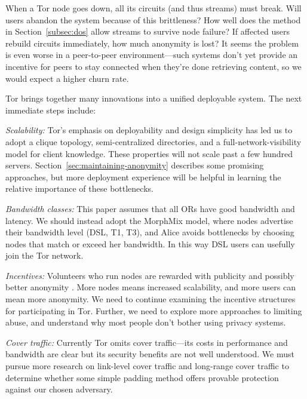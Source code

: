 \documentclass[times,10pt,twocolumn]{article}
\begin{document}

When a Tor node goes down, all its circuits (and thus streams) must break.
Will users abandon the system because of this brittleness? How well
does the method in Section~\ref{subsec:dos} allow streams to survive
node failure? If affected users rebuild circuits immediately, how much
anonymity is lost? It seems the problem is even worse in a peer-to-peer
environment---such systems don't yet provide an incentive for peers to
stay connected when they're done retrieving content, so we would expect
a higher churn rate.


\label{sec:conclusion}

Tor brings together many innovations into a unified deployable system. The
next immediate steps include:

\emph{Scalability:} Tor's emphasis on deployability and design simplicity
has led us to adopt a clique topology, semi-centralized
directories, and a full-network-visibility model for client
knowledge. These properties will not scale past a few hundred servers.
Section~\ref{sec:maintaining-anonymity} describes some promising
approaches, but more deployment experience will be helpful in learning
the relative importance of these bottlenecks.

\emph{Bandwidth classes:} This paper assumes that all ORs have
good bandwidth and latency. We should instead adopt the MorphMix model,
where nodes advertise their bandwidth level (DSL, T1, T3), and
Alice avoids bottlenecks by choosing nodes that match or
exceed her bandwidth. In this way DSL users can usefully join the Tor
network.

\emph{Incentives:} Volunteers who run nodes are rewarded with publicity
and possibly better anonymity \cite{econymics}. More nodes means increased
scalability, and more users can mean more anonymity. We need to continue
examining the incentive structures for participating in Tor. Further,
we need to explore more approaches to limiting abuse, and understand
why most people don't bother using privacy systems.

\emph{Cover traffic:} Currently Tor omits cover traffic---its costs
in performance and bandwidth are clear but its security benefits are
not well understood. We must pursue more research on link-level cover
traffic and long-range cover traffic to determine whether some simple padding
method offers provable protection against our chosen adversary.
\end{document}
